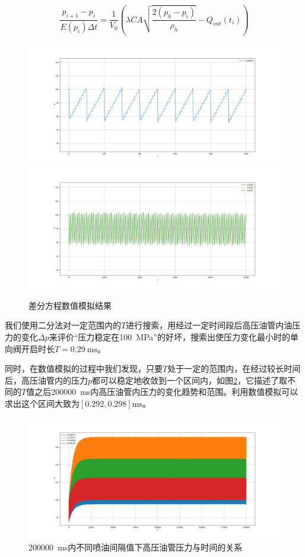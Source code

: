 \documentclass[12pt,AutoFakeBold]{article}%
\begin{document}
    \begin{equation}
        \frac{p_{i+1}-p_i}{E(p_i)\Delta t}=\frac{1}{V_0}\left(\lambda CA\sqrt{\frac{2\left(p_h-p_i\right)}{\rho_h}}-Q_{out}(t_i)\right)
    \end{equation}
    \begin{figure}[H]
        \centering
        \includegraphics[scale=0.32]{figure/11-0.png}
        \includegraphics[scale=0.32]{figure/11-exgap-1}
        \caption{差分方程数值模拟结果}
        \label{ptfigure1}
    \end{figure}
    我们使用二分法对一定范围内的$T$进行搜索，用经过一定时间段后高压油管内油压力的变化$\Delta p$来评价“压力稳定在\SI{100}{\MPa}”的好坏，搜索出使压力变化最小时的单向阀开启时长$T=\SI{0.29}{\ms}$。\par
    同时，在数值模拟的过程中我们发现，只要$T$处于一定的范围内，在经过较长时间后，高压油管内的压力$p$都可以稳定地收敛到一个区间内，如图\ref{11top2}，它描述了取不同的$T$值之后\SI{200000}{\ms}内高压油管内压力的变化趋势和范围。利用数值模拟可以求出这个区间大致为$[0.292,0.298]\si{\ms}$。\par
    \begin{figure}[H]
        \centering
        \includegraphics[scale=0.32]{figure/11-t-2.png}
        \caption{\SI{200000}{\ms}内不同喷油间隔值下高压油管压力与时间的关系}
        \label{11top2}
    \end{figure}
\end{document}
